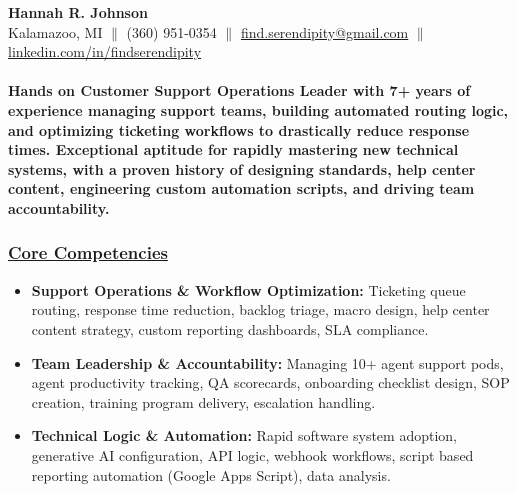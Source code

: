 \documentclass[a4paper,10pt]{article}
\begin{document}
\begin{center}
      {\LARGE \textbf{Hannah R. Johnson}} \\
      Kalamazoo, MI $\parallel$ (360) 951-0354 $\parallel$ \href{mailto:find.serendipity@gmail.com}{find.serendipity@gmail.com} $\parallel$ \href{https://www.linkedin.com/in/findserendipity/}{linkedin.com/in/findserendipity}
\end{center}

\paragraph{Hands on Customer Support Operations Leader with 7+ years of experience managing support teams, building automated routing logic, and optimizing ticketing workflows to drastically reduce response times. Exceptional aptitude for rapidly mastering new technical systems, with a proven history of designing standards, help center content, engineering custom automation scripts, and driving team accountability.}

\subsubsection{\underline{Core Competencies}}

\begin{itemize}
    \item \textbf{Support Operations \& Workflow Optimization:} Ticketing queue routing, response time reduction, backlog triage, macro design, help center content strategy, custom reporting dashboards, SLA compliance.
    \item \textbf{Team Leadership \& Accountability:} Managing 10+ agent support pods, agent productivity tracking, QA scorecards, onboarding checklist design, SOP creation, training program delivery, escalation handling.
    \item \textbf{Technical Logic \& Automation:} Rapid software system adoption, generative AI configuration, API logic, webhook workflows, script based reporting automation (Google Apps Script), data analysis.
\end{itemize}
\end{document}
